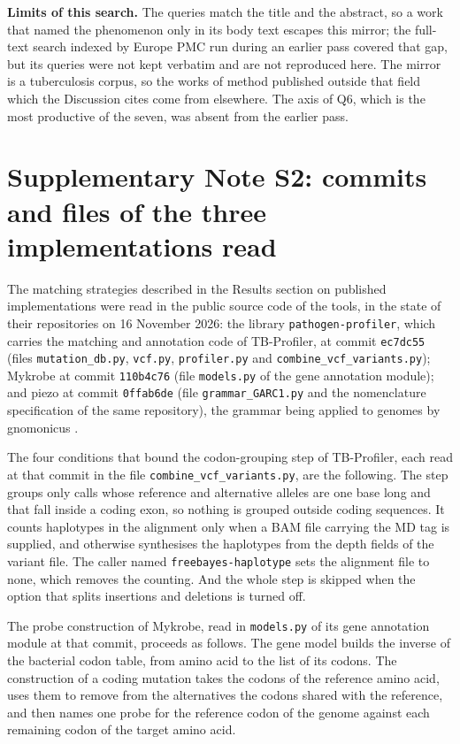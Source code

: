 \documentclass[11pt]{article}
\begin{document}
\textbf{Limits of this search.} The queries match the title and the abstract, so a work that
named the phenomenon only in its body text escapes this mirror; the full-text search indexed
by Europe PMC run during an earlier pass covered that gap, but its queries were not kept
verbatim and are not reproduced here. The mirror is a tuberculosis corpus, so the works of
method published outside that field which the Discussion cites
\cite{srinivasan2021,wang2020,repun2024,tan2015} come from elsewhere. The axis of Q6, which
is the most productive of the seven, was absent from the earlier pass.

\section*{Supplementary Note S2: commits and files of the three implementations read}

The matching strategies described in the Results section on published implementations were
read in the public source code of the tools, in the state of their repositories on 16
November 2026: the library \texttt{pathogen-profiler}, which carries the matching and
annotation code of TB-Profiler, at commit \texttt{ec7dc55} (files \texttt{mutation\_db.py},
\texttt{vcf.py}, \texttt{profiler.py} and \texttt{combine\_vcf\_variants.py}); Mykrobe
\cite{hunt2019} at commit \texttt{110b4c76} (file \texttt{models.py} of the gene annotation
module); and piezo \cite{piezo} at commit \texttt{0ffab6de} (file
\texttt{grammar\_GARC1.py} and the nomenclature specification of the same repository), the
grammar being applied to genomes by gnomonicus \cite{gnomonicus}.

The four conditions that bound the codon-grouping step of TB-Profiler, each read at that
commit in the file \texttt{combine\_vcf\_}\allowbreak\texttt{variants.py}, are the following.
The step groups only
calls whose reference and alternative alleles are one base long and that fall inside a coding
exon, so nothing is grouped outside coding sequences. It counts haplotypes in the alignment
only when a BAM file carrying the MD tag is supplied, and otherwise synthesises the haplotypes
from the depth fields of the variant file. The caller named \texttt{freebayes-haplotype} sets
the alignment file to none, which removes the counting. And the whole step is skipped when the
option that splits insertions and deletions is turned off.

The probe construction of Mykrobe, read in \texttt{models.py} of its gene annotation module at
that commit, proceeds as follows. The gene model builds the inverse of the bacterial codon
table, from amino acid to the list of its codons. The construction of a coding mutation takes
the codons of the reference amino acid, uses them to remove from the alternatives the codons
shared with the reference, and then names one probe for the reference codon of the genome
against each remaining codon of the target amino acid.
\end{document}
